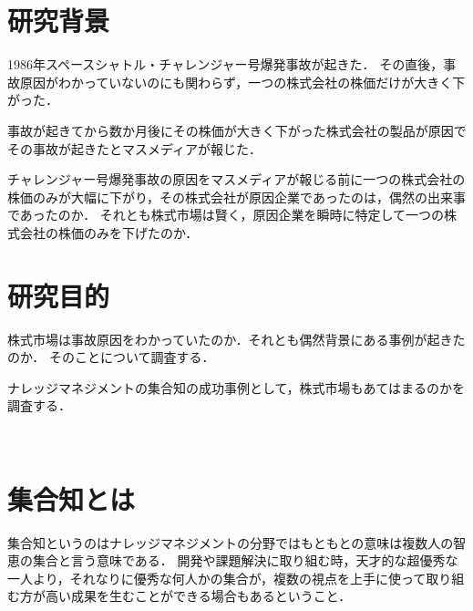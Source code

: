 \usepackage{here}

\title{}
\author{プロジェクトマネジメントコース\\
ソフトウェア開発管理グループ\\
矢吹研究室\\
1242109\\
三宅琢己}
\date{集合知の成功事例としての株価変動についての調査}

\maketitle



\tableofcontents%

\chapter{研究背景}

1986年スペースシャトル・チャレンジャー号爆発事故が起きた．
その直後，事故原因がわかっていないのにも関わらず，一つの株式会社の株価だけが大きく下がった．

事故が起きてから数か月後にその株価が大きく下がった株式会社の製品が原因でその事故が起きたとマスメディアが報じた\cite{miyake2}．

チャレンジャー号爆発事故の原因をマスメディアが報じる前に一つの株式会社の株価のみが大幅に下がり，その株式会社が原因企業であったのは，偶然の出来事であったのか．
それとも株式市場は賢く，原因企業を瞬時に特定して一つの株式会社の株価のみを下げたのか．

\chapter{研究目的}


株式市場は事故原因をわかっていたのか．それとも偶然背景にある事例が起きたのか．
そのことについて調査する．

ナレッジマネジメントの集合知の成功事例として，株式市場もあてはまるのかを調査する．


　　　　　　　　　　　　　　　　　　　　　　　　　　　　　　　　　　　　　　　　　　　　　　　　　　　　　　　　　　　　　　　　　　　　　　　　　　　　　　　　　　　　　　　　　　　

\chapter{集合知とは}
集合知というのはナレッジマネジメントの分野ではもともとの意味は複数人の智恵の集合と言う意味である．
開発や課題解決に取り組む時，天才的な超優秀な一人より，それなりに優秀な何人かの集合が，複数の視点を上手に使って取り組む方が高い成果を生むことができる場合もあるということ．


